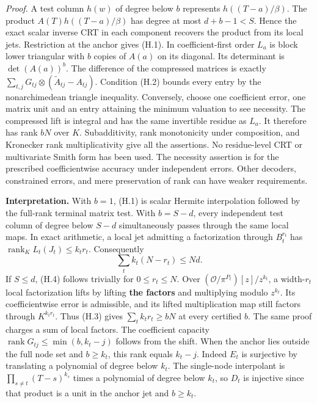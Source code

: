 \documentclass[
  11pt,
]{article}
\begin{document}
\emph{Proof.} A test column \(h(w)\) of degree below \(b\) represents
\(h((T-a)/\beta)\). The product \(A(T)h((T-a)/\beta)\) has degree at
most \(d+b-1<S\). Hence the exact scalar inverse CRT in each component
recovers the product from its local jets. Restriction at the anchor
gives (H.1). In coefficient-first order \(L_a\) is block lower
triangular with \(b\) copies of \(A(a)\) on its diagonal. Its
determinant is \(\det(A(a))^b\). The difference of the compressed
matrices is exactly
\(\sum_{t,j}G_{tj}\otimes(\widetilde A_{tj}-A_{tj})\). Condition (H.2)
bounds every entry by the nonarchimedean triangle inequality.
Conversely, choose one coefficient error, one matrix unit and an entry
attaining the minimum valuation to see necessity. The compressed lift is
integral and has the same invertible residue as \(L_a\). It therefore
has rank \(bN\) over \(K\). Subadditivity, rank monotonicity under
composition, and Kronecker rank multiplicativity give all the
assertions. No residue-level CRT or multivariate Smith form has been
used. The necessity assertion is for the prescribed coefficientwise
accuracy under independent errors. Other decoders, constrained errors,
and mere preservation of rank can have weaker requirements.

\textbf{Interpretation.} With \(b=1\), (H.1) is scalar Hermite
interpolation followed by the full-rank terminal matrix test. With
\(b=S-d\), every independent test column of degree below \(S-d\)
simultaneously passes through the same local maps. In exact arithmetic,
a local jet admitting a factorization through \(B_t^{r_t}\) has
\(\operatorname{rank}_K L_t(J_t)\le k_t r_t\). Consequently \[
                       \sum_t k_t(N-r_t)\le Nd. \tag{H.4}
\] If \(S\le d\), (H.4) follows trivially for \(0\le r_t\le N\). Over
\((\mathcal O/\pi^{P_t})[z]/z^{k_t}\), a width-\(r_t\) local
factorization lifts by lifting \textbf{the factors} and multiplying
modulo \(z^{k_t}\). Its coefficientwise error is admissible, and its
lifted multiplication map still factors through \(K^{k_t r_t}\). Thus
(H.3) gives \(\sum_t k_t r_t\ge bN\) at every certified \(b\). The same
proof charges a sum of local factors. The coefficient capacity
\(\operatorname{rank}G_{tj}\le\min(b,k_t-j)\) follows from the shift.
When the anchor lies outside the full node set and \(b\ge k_t\), this
rank equals \(k_t-j\). Indeed \(E_t\) is surjective by translating a
polynomial of degree below \(k_t\). The single-node interpolant is
\(\prod_{s\ne t}(T-s)^{k_s}\) times a polynomial of degree below
\(k_t\), so \(D_t\) is injective since that product is a unit in the
anchor jet and \(b\ge k_t\).
\end{document}

